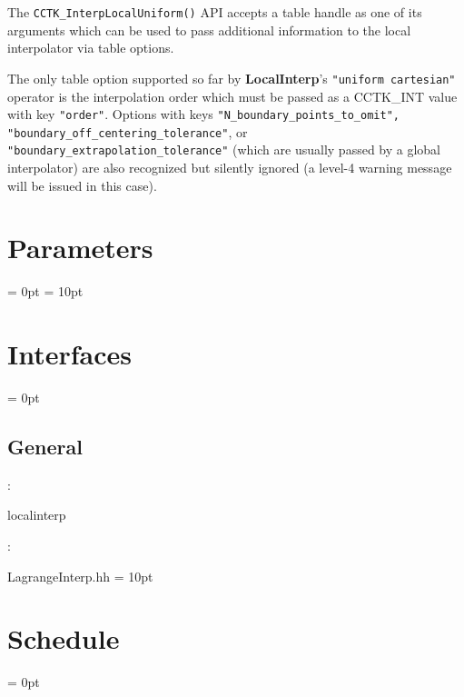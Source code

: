 The \verb|CCTK_InterpLocalUniform()| API accepts a table handle as one of its
arguments which can be used to pass additional information to the local
interpolator via table options.

The only table option supported so far by {\bf LocalInterp}'s {\tt "uniform
cartesian"} operator is the interpolation order which must be
passed as a CCTK\_INT value with key {\tt "order"}. Options with keys
{\tt "N\_boundary\_points\_to\_omit", "boundary\_off\_centering\_tolerance"}, or
{\tt "boundary\_extrapolation\_tolerance"} (which are usually passed by a
global interpolator) are also recognized but silently ignored (a level-4 warning
message will be issued in this case).





\section{Parameters} 


\parskip = 0pt
\parskip = 10pt 

\section{Interfaces} 


\parskip = 0pt

\vspace{3mm} \subsection*{General}

: 

localinterp
\vspace{2mm}

\vspace{5mm}

: 



LagrangeInterp.hh
\vspace{2mm}\parskip = 10pt 

\section{Schedule} 


\parskip = 0pt


